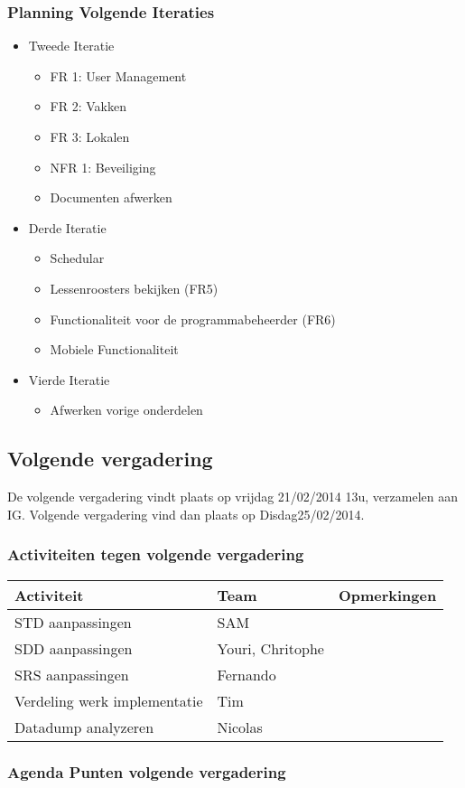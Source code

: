 \subsubsection{Planning Volgende Iteraties}
\begin{itemize}
	\item
	{
		Tweede Iteratie
		\begin{itemize}
			\item FR 1: User Management
			\item FR 2: Vakken
			\item FR 3: Lokalen
			\item NFR 1: Beveiliging
			\item Documenten afwerken
		\end{itemize}
	}
	\item
	{
		Derde Iteratie
		\begin{itemize}
			\item Schedular
			\item Lessenroosters bekijken (FR5)
			\item Functionaliteit voor de programmabeheerder (FR6)
			\item Mobiele Functionaliteit
		\end{itemize}
	}
	\item
	{
		Vierde Iteratie
		\begin{itemize}
			\item Afwerken vorige onderdelen
		\end{itemize}
	}
\end{itemize}

\subsection{Volgende vergadering}
De volgende vergadering vindt plaats op vrijdag 21/02/2014 13u, verzamelen aan IG.
Volgende vergadering vind dan plaats op Disdag25/02/2014.
\subsubsection{Activiteiten tegen volgende vergadering} \label{sec:TODOActiviteiten}
\begin{table} [H]
	\centering
	\begin{tabular} {l|l|l}
		\textbf{Activiteit} & \textbf{Team} & \textbf{Opmerkingen} \\
		\hline
		 STD aanpassingen & SAM  & \\
		 SDD aanpassingen & Youri, Chritophe & \\
		 SRS aanpassingen & Fernando & \\
		 Verdeling werk implementatie & Tim & \\
		 Datadump analyzeren & Nicolas & \\ 
	\end{tabular}
\end{table}

\subsubsection{Agenda Punten volgende vergadering}
